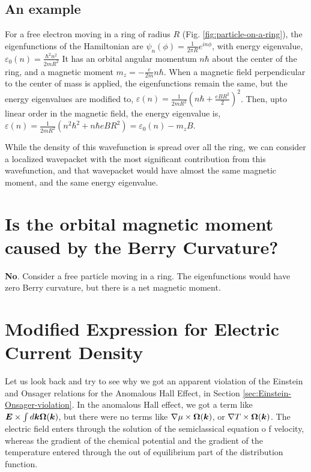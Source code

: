 \documentclass{report}
\renewcommand\vec[1]{\ensuremath\boldsymbol{#1}} %
\begin{document}
\subsection{An example}

For a free electron moving in a ring of radius $R$ (Fig. \ref{fig:particle-on-a-ring}), the eigenfunctions of the Hamiltonian are $\psi_n(\phi) = \frac{1}{2 \pi R} e^{i n \phi}$, with energy eigenvalue, $\varepsilon_{0}(n) = \frac{\hbar^2 n^2}{2 m R^2}$ It has an orbital angular momentum $n\hbar$ about the center of the ring, and a magnetic moment $m_z = -\frac{e}{2m} n\hbar$.
When a magnetic field perpendicular to the center of mass is applied, the eigenfunctions remain the same, but the energy eigenvalues are modified to,
$\varepsilon(n) = \frac{1}{2 m R^2} (n\hbar + \frac{eBR^2}{2})^2$. Then, upto linear order in the magnetic field, the energy eigenvalue is, $\varepsilon(n) = \frac{1}{2 m R^2} (n^2\hbar^2 + n \hbar eBR^2) = \varepsilon_{0}(n) - m_z B$.


While the density of this wavefunction is spread over all the ring, we can consider a localized wavepacket with the most significant contribution from this wavefunction, and that wavepacket would have almost the same magnetic moment, and the same energy eigenvalue.

\section{Is the orbital magnetic moment caused by the Berry Curvature?}
\textbf{No}. Consider a free particle moving in a ring. The eigenfunctions would have zero Berry curvature, but there is a net magnetic moment.
\section{Modified Expression for Electric Current Density}
Let us look back and try to see why we got an apparent violation of the Einstein and Onsager relations for the Anomalous Hall Effect, in Section \ref{sec:Einstein-Onsager-violation}. In the anomalous Hall effect, we got a term like $\vec{E} \times \int d\vec{k} \vec{\Omega}(\vec{k}) $, but there were no terms like $\nabla \mu \times \vec{\Omega}(\vec{k}) $, or $\nabla T \times \vec{\Omega}(\vec{k}) $. The electric field enters through the solution of the semiclassical equation o f velocity, whereas the gradient of the chemical potential and the gradient of the temperature entered through the out of equilibrium part of the distribution function.
\end{document}
